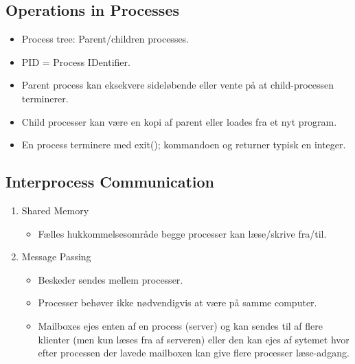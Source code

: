 \documentclass[a4wide,10pt]{article}
\begin{document}
\subsection{Operations in Processes} %
\label{sub:3_3}
\begin{itemize}
	\item Process tree: Parent/children processes.
	\item PID = Process IDentifier.
	\item Parent process kan eksekvere sideløbende eller vente på at child-processen terminerer.
	\item Child processer kan være en kopi af parent eller loades fra et nyt program.
	\item En process terminere med exit(); kommandoen og returner typisk en integer.
\end{itemize}

\subsection{Interprocess Communication} %
\label{sub:3_4}
\begin{enumerate}
	\item Shared Memory
	\begin{itemize}
		\item Fælles hukkommelsesområde begge processer kan læse/skrive fra/til.
	\end{itemize}
	\item Message Passing
	\begin{itemize}
		\item Beskeder sendes mellem processer.
		\item Processer behøver ikke nødvendigvis at være på samme computer.
		\item Mailboxes ejes enten af en process (server) og kan sendes til af flere klienter (men kun læses fra af serveren) eller den kan ejes af sytemet hvor efter processen der lavede mailboxen kan give flere processer læse-adgang.
	\end{itemize}
\end{enumerate}

\end{document}
